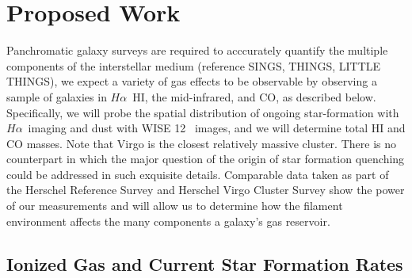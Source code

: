 \documentclass[11pt, preprint]{aastex}
\newcommand{\ha}{$H\alpha$}
\begin{document}
\vspace*{-.8cm}\section{Proposed Work} 
\vspace*{-.2cm}
Panchromatic galaxy surveys are required to acccurately quantify the multiple
components of the interstellar medium (reference SINGS, THINGS, LITTLE
THINGS), we expect a variety of gas effects to be observable by observing a
sample of galaxies in \ha\, HI, the mid-infrared, and CO, as described
below.  
Specifically, we will probe the spatial distribution of
ongoing star-formation with \ha \ imaging and dust with WISE 12\micron
\ images, and we will determine total HI and CO masses.
Note that Virgo is the closest relatively massive cluster. There is no counterpart
in which the major question of the origin of star formation quenching could be
addressed in such exquisite details.
Comparable data taken as part of the Herschel Reference Survey
\citep{Ciesla12} and Herschel Virgo Cluster Survey \citep{davies10}
show the power of our measurements and will allow us to determine how
the filament environment affects the many components a galaxy's gas
reservoir.






\vspace*{-1cm}
\subsection{Ionized Gas and Current Star Formation Rates}
\vspace*{-.3cm}
\end{document}
